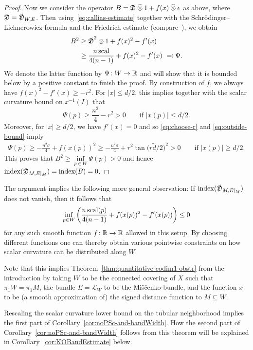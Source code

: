 \documentclass[pdftex]{sigma}
\numberwithin{equation}{section}
\newcommand*{\Mishchenko}{Mi\v{s}\v{c}enko}
\begin{document}
\begin{proof}
 Now we consider the operator
 \(
 B = \slashed{\mathfrak{D}} \mathbin{\widehat{\otimes}} 1 + f(x) \mathbin{\widehat{\otimes}} \epsilon
 \)
 as above, where \(\slashed{\mathfrak{D}} = \slashed{\mathfrak{D}}_{W,E}\).
 Then \linebreak using~\eqref{eq:callias-estimate} together with the Schr\"odinger--Lichnerowicz formula and the Friedrich estimate (compare~\cite[Section~3.2]{Cecchini:LongNeck}), we obtain
 \begin{align*}
 B^2 &\geq \slashed{\mathfrak{D}}^2 \otimes 1 + f(x)^2 - f'(x) \\
 &\geq {\frac{n \operatorname{scal}}{4(n-1)} + f(x)^2 - f'(x)}\ \eqqcolon \Psi.
 \end{align*}
 We denote the latter function by \(\Psi \colon W \to \mathbb{R}\) and will show that it is bounded below by a positive constant to finish the proof.
 By construction of \(f\), we always have \(f(x)^2 - f'(x) \geq -r^2\).
 For \(|x| \leq d/2\), this implies together with the scalar curvature bound on \(x^{-1}(I)\) that
 \[
 \Psi(p) \geq \frac{n^2}{4} - r^2 > 0 \qquad \text{if \(|x(p)| \leq d/2\).}
 \]
 Moreover, for \(|x| \geq d/2\), we have \(f'(x) = 0\) and so \eqref{eq:choose-r} and \eqref{eq:outside-bound} imply
 \begin{align*}
\Psi(p) \geq - \frac{n^2 \sigma}{4} + f(x(p))^2 \geq - \frac{n^2 \sigma}{4} + r^2 \tan\big(r \tilde{d} / 2\big)^2 > 0 \qquad \text{if \(|x(p)| \geq d/2\).}
 \end{align*}
 This proves that \(B^2 \geq \inf\limits_{p \in W} \Psi(p) > 0\) and hence \(\operatorname{index}(\slashed{\mathfrak{D}}_{M, E|_M}) = \operatorname{index}(B) = 0\).
 \end{proof}
 \begin{Remark}
 The argument implies the following more general observation:
 If \(\operatorname{index}(\slashed{\mathfrak{D}}_{M, E|_M})\) does not vanish, then it follows that
 \[
 \inf_{p \in W} \left( \frac{n \operatorname{scal}(p)}{4(n-1)} + f(x(p))^2 - f'(x(p)) \right) \leq 0
 \]
 for any such smooth function \(f \colon \mathbb{R} \to \mathbb{R}\) allowed in this setup.
 By choosing different functions one can thereby obtain various pointwise constraints on how scalar curvature can be distributed along \(W\).
 \end{Remark}

 Note that this implies Theorem~\ref{thm:quantitative-codim1-obstr} from the introduction by taking \(W\) to be the connected covering of \(X\) such that \(\pi_1 W = \pi_1 M\), the bundle \(E = \mathcal{L}_W\) to be the \Mishchenko-bundle, and the function \(x\) to be (a smooth approximation of) the signed distance function to \(M \subseteq W\).

Rescaling the scalar curvature lower bound on the tubular neighborhood implies the first part of Corollary~\ref{cor:noPSc-and-bandWidth}.
 How the second part of Corollary~\ref{cor:noPSc-and-bandWidth} follows from this theorem will be explained in Corollary~\ref{cor:KOBandEstimate} below.
\end{document}
